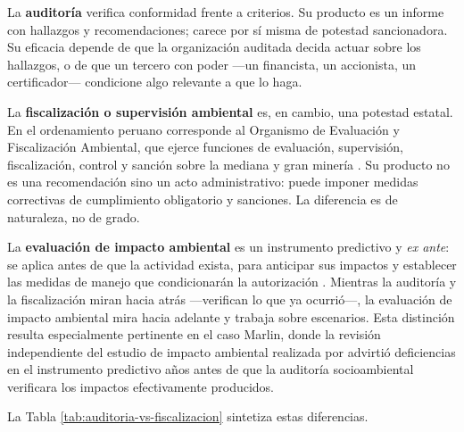 La \textbf{auditoría} verifica conformidad frente a criterios. Su producto es un
informe con hallazgos y recomendaciones; carece por sí misma de potestad
sancionadora. Su eficacia depende de que la organización auditada decida actuar
sobre los hallazgos, o de que un tercero con poder —un financista, un accionista,
un certificador— condicione algo relevante a que lo haga.

La \textbf{fiscalización o supervisión ambiental} es, en cambio, una potestad
estatal. En el ordenamiento peruano corresponde al Organismo de Evaluación y
Fiscalización Ambiental, que ejerce funciones de evaluación, supervisión,
fiscalización, control y sanción sobre la mediana y gran minería
\parencite{congreso2009ley29325}. Su producto no es una recomendación sino un acto
administrativo: puede imponer medidas correctivas de cumplimiento obligatorio y
sanciones. La diferencia es de naturaleza, no de grado.

La \textbf{evaluación de impacto ambiental} es un instrumento predictivo y
\textit{ex ante}: se aplica antes de que la actividad exista, para anticipar sus
impactos y establecer las medidas de manejo que condicionarán la autorización
\parencite{congreso2001ley27446}. Mientras la auditoría y la fiscalización miran
hacia atrás —verifican lo que ya ocurrió—, la evaluación de impacto ambiental mira
hacia adelante y trabaja sobre escenarios. Esta distinción resulta especialmente
pertinente en el caso Marlin, donde la revisión independiente del estudio de
impacto ambiental realizada por \textcite{moran2004review} advirtió deficiencias
en el instrumento predictivo años antes de que la auditoría socioambiental
verificara los impactos efectivamente producidos.

La Tabla \ref{tab:auditoria-vs-fiscalizacion} sintetiza estas diferencias.

